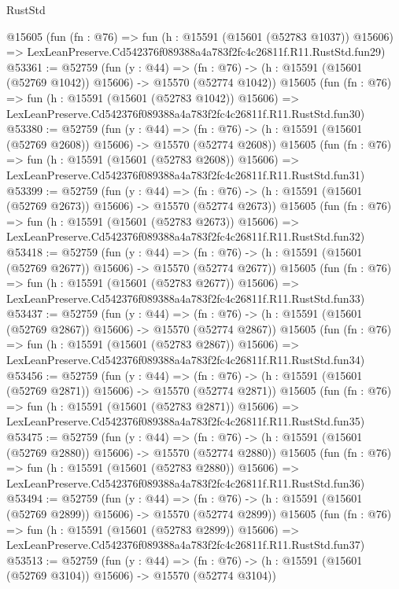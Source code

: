 \begin{lexlean}{RustStd}
\begin{coremodule}
    @15605
    (fun (fn : @76) =>
    fun (h : @15591 (@15601 (@52783 @1037)) @15606) =>
    LexLeanPreserve.Cd542376f089388a4a783f2fc4c26811f.R11.RustStd.fun29)
@53361 := @52759
    (fun (y : @44) =>
    (fn : @76) -> (h : @15591 (@15601 (@52769 @1042)) @15606) -> @15570 (@52774 @1042))
    @15605
    (fun (fn : @76) =>
    fun (h : @15591 (@15601 (@52783 @1042)) @15606) =>
    LexLeanPreserve.Cd542376f089388a4a783f2fc4c26811f.R11.RustStd.fun30)
@53380 := @52759
    (fun (y : @44) =>
    (fn : @76) -> (h : @15591 (@15601 (@52769 @2608)) @15606) -> @15570 (@52774 @2608))
    @15605
    (fun (fn : @76) =>
    fun (h : @15591 (@15601 (@52783 @2608)) @15606) =>
    LexLeanPreserve.Cd542376f089388a4a783f2fc4c26811f.R11.RustStd.fun31)
@53399 := @52759
    (fun (y : @44) =>
    (fn : @76) -> (h : @15591 (@15601 (@52769 @2673)) @15606) -> @15570 (@52774 @2673))
    @15605
    (fun (fn : @76) =>
    fun (h : @15591 (@15601 (@52783 @2673)) @15606) =>
    LexLeanPreserve.Cd542376f089388a4a783f2fc4c26811f.R11.RustStd.fun32)
@53418 := @52759
    (fun (y : @44) =>
    (fn : @76) -> (h : @15591 (@15601 (@52769 @2677)) @15606) -> @15570 (@52774 @2677))
    @15605
    (fun (fn : @76) =>
    fun (h : @15591 (@15601 (@52783 @2677)) @15606) =>
    LexLeanPreserve.Cd542376f089388a4a783f2fc4c26811f.R11.RustStd.fun33)
@53437 := @52759
    (fun (y : @44) =>
    (fn : @76) -> (h : @15591 (@15601 (@52769 @2867)) @15606) -> @15570 (@52774 @2867))
    @15605
    (fun (fn : @76) =>
    fun (h : @15591 (@15601 (@52783 @2867)) @15606) =>
    LexLeanPreserve.Cd542376f089388a4a783f2fc4c26811f.R11.RustStd.fun34)
@53456 := @52759
    (fun (y : @44) =>
    (fn : @76) -> (h : @15591 (@15601 (@52769 @2871)) @15606) -> @15570 (@52774 @2871))
    @15605
    (fun (fn : @76) =>
    fun (h : @15591 (@15601 (@52783 @2871)) @15606) =>
    LexLeanPreserve.Cd542376f089388a4a783f2fc4c26811f.R11.RustStd.fun35)
@53475 := @52759
    (fun (y : @44) =>
    (fn : @76) -> (h : @15591 (@15601 (@52769 @2880)) @15606) -> @15570 (@52774 @2880))
    @15605
    (fun (fn : @76) =>
    fun (h : @15591 (@15601 (@52783 @2880)) @15606) =>
    LexLeanPreserve.Cd542376f089388a4a783f2fc4c26811f.R11.RustStd.fun36)
@53494 := @52759
    (fun (y : @44) =>
    (fn : @76) -> (h : @15591 (@15601 (@52769 @2899)) @15606) -> @15570 (@52774 @2899))
    @15605
    (fun (fn : @76) =>
    fun (h : @15591 (@15601 (@52783 @2899)) @15606) =>
    LexLeanPreserve.Cd542376f089388a4a783f2fc4c26811f.R11.RustStd.fun37)
@53513 := @52759
    (fun (y : @44) =>
    (fn : @76) -> (h : @15591 (@15601 (@52769 @3104)) @15606) -> @15570 (@52774 @3104))

\end{coremodule}
\end{lexlean}
